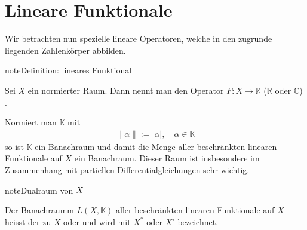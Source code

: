 \documentclass[letterpaper,10pt,english]{jupyterBook}
\begin{document}
\section{Lineare Funktionale}
\label{\detokenize{Funktionalanalysis/LineareOperatoren:lineare-funktionale}}
Wir betrachten nun spezielle lineare Operatoren, welche in den zugrunde liegenden Zahlenkörper abbilden.

\begin{sphinxadmonition}{note}{Definition: lineares Funktional}

Sei \(X\) ein normierter Raum. Dann nennt man den Operator \(F: X \to \mathbb{K}\) (\(\mathbb{R}\) oder \(\mathbb{C}\)) .
\end{sphinxadmonition}

Normiert man \(\mathbb{K}\) mit
\begin{equation*}
\begin{split}\|\alpha\| := |\alpha|,\quad\alpha\in\mathbb{K}\end{split}
\end{equation*}
so ist \(\mathbb{K}\) ein Banachraum und damit die Menge aller beschränkten linearen Funktionale auf \(X\) ein Banachraum. Dieser Raum ist insbesondere im Zusammenhang mit partiellen Differentialgleichungen sehr wichtig.

\begin{sphinxadmonition}{note}{Dualraum von \protect\(X\protect\)}

Der Banachraumm \(L(X,\mathbb{K})\) aller beschränkten linearen Funktionale auf \(X\) heisst der zu \(X\)  oder  und wird mit \(X^*\) oder \(X'\) bezeichnet.
\end{sphinxadmonition}
\end{document}
